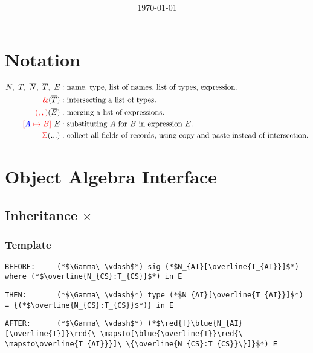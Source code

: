 \documentclass{article}
\title{\huge\textmd{\bf\thistitle}}
\date{}
\author{\today}
\newcommand{\red}[1]{\textcolor{red}{#1}}
\newcommand{\blue}[1]{\textcolor{blue}{#1}}
\begin{document}
\begin{spacing}{1.1}
\maketitle \thispagestyle{empty}


\section*{Notation}

\begin{align*}
N,\ T,\ \overline{N},\ \overline{T},\ E:&\textrm{ name, type, list of names, list of types, expression.}\\
\red{\&}(\overline{T}):&\textrm{ intersecting a list of types.}\\
\red{(,,)}(\overline{E}):&\textrm{ merging a list of expressions.}\\
\red{[}\blue{A}\red{\ \mapsto B]}\ E:&\textrm{ substituting }A\textrm{ for }B\textrm{ in expression }E.\\
\red{\Sigma}(...):&\textrm{ collect all fields of records, using copy and paste instead of intersection.}
\end{align*}

\section{Object Algebra Interface}

\subsection{Inheritance $\times$}

\subsubsection{Template}

\begin{lstlisting}[numbers=none]
BEFORE:     (*$\Gamma\ \vdash$*) sig (*$N_{AI}[\overline{T_{AI}}]$*) where (*$\overline{N_{CS}:T_{CS}}$*) in E
\end{lstlisting}
\begin{lstlisting}[numbers=none]
THEN:       (*$\Gamma\ \vdash$*) type (*$N_{AI}[\overline{T_{AI}}]$*) = {(*$\overline{N_{CS}:T_{CS}}$*)} in E
\end{lstlisting}
\begin{lstlisting}[numbers=none]
AFTER:      (*$\Gamma\ \vdash$*) (*$\red{[}\blue{N_{AI}[\overline{T}]}\red{\ \mapsto[\blue{\overline{T}}\red{\ \mapsto\overline{T_{AI}}}]\ \{\overline{N_{CS}:T_{CS}}\}]}$*) E
\end{lstlisting}


\end{spacing}
\end{document}
